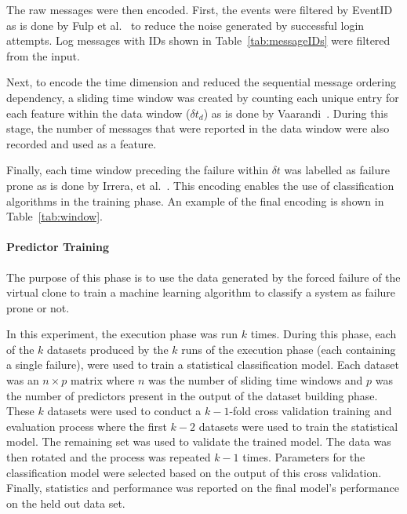 \tabMessage

The raw messages were then encoded.  First, the events were filtered by EventID
as is done by Fulp et al.~\cite{fulp2008} to reduce the noise generated by
successful login attempts.  Log messages with IDs shown in
Table~\ref{tab:messageIDs} were filtered from the input.  

Next, to encode the time dimension and reduced the sequential message ordering
dependency, a sliding time window was created by counting each unique entry for
each feature within the data window ($\delta t_d$) as is done by
Vaarandi~\cite{vaarandi2002}.  During this stage, the number of messages that
were reported in the data window were also recorded and used as a feature.

Finally, each time window preceding the failure within $\delta t$ was labelled
as failure prone as is done by Irrera, et al.~\cite{irrera2015}.  This encoding
enables the use of classification algorithms in the training phase.  An example
of the final encoding is shown in Table~\ref{tab:window}.

\tabMessageIDs %
\tabSlidingWindow

\paragraph{Predictor Training} \label{sec:predictor.training}
The purpose of this phase is to use the data generated by the forced failure of
the virtual clone to train a machine learning algorithm to classify a system as
failure prone or not.  

In this experiment, the execution phase was run $k$ times.  During this phase,
each of the $k$ datasets produced by the $k$ runs of the execution phase (each
containing a single failure), were used to train a statistical classification
model.  Each dataset was an $n \times p$ matrix where $n$ was the number of
sliding time windows and $p$ was the number of predictors present in the output
of the dataset building phase.  These $k$ datasets were used to conduct a $k -
1$-fold cross validation training and evaluation process where the first $k -
2$ datasets were used to train the statistical model.  The remaining set was
used to validate the trained model.  The data was then rotated and the process
was repeated $k - 1$ times.  Parameters for the classification model were
selected based on the output of this cross validation.  Finally, statistics and
performance was reported on the final model's performance on the held out data
set.

